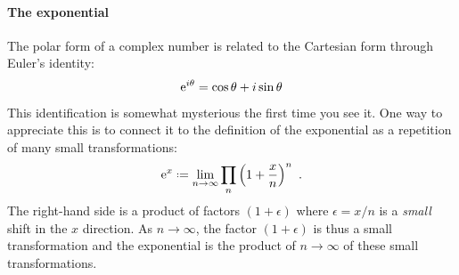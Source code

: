 \documentclass[12pt, oneside]{report}    %
\begin{document}
\paragraph{The exponential}
The polar form of a complex number is related to the Cartesian form through Euler's identity:
\begin{align}
    \operatorname{e}^{i\theta} = \cos\theta + i\sin\theta
\end{align}
This identification is somewhat mysterious the first time you see it. One way to appreciate this is to connect it to the definition of the exponential as a repetition of many small transformations:
\begin{align}
    \e^x \defeq \lim_{n\to\infty} 
    \prod _n \left(1+\frac{x}{n}\right)^n \ .
\end{align}
The right-hand side is a product of factors $(1+\epsilon)$ where $\epsilon = x/n$ is a \emph{small} shift in the $x$ direction. As $n\to\infty$, the factor $(1+\epsilon)$ is thus a small transformation and the exponential is the product of $n\to\infty$ of these small transformations. 
\end{document}
